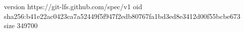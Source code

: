 version https://git-lfs.github.com/spec/v1
oid sha256:b41e22ac0423ca7a52449f5f947f2edb80767fa1bd3ed8e3412d00f55bcbe673
size 349700
